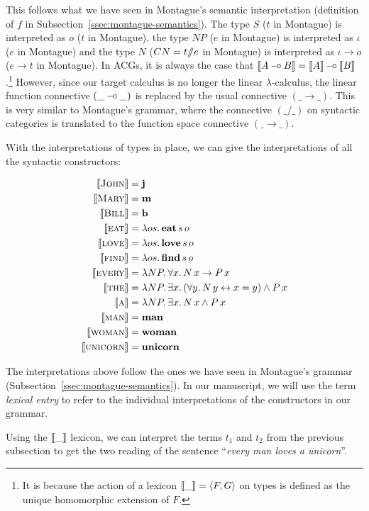 This follows what we have seen in Montague's semantic interpretation
(definition of $f$ in Subsection~\ref{ssec:montague-semantics}). The type
$S$ ($t$ in Montague) is interpreted as $o$ ($t$ in Montague), the type
$NP$ ($e$ in Montague) is interpreted as $\iota$ ($e$ in Montague) and the
type $N$ ($CN = t /\!\!/ e$ in Montague) is interpreted as
$\iota \to o$ ($e \to t$ in Montague). In ACGs, it is always the case that
$\llbracket A \mathbin{{-}\mkern-3.5mu{\circ}} B \rrbracket = \llbracket A \rrbracket \mathbin{{-}\mkern-3.5mu{\circ}} \llbracket B \rrbracket$.\footnote{It is because the
  action of a lexicon $\llbracket \_ \rrbracket = \left< F, G \right>$ on types is defined
  as the unique homomorphic extension of $F$.} However, since our target
calculus is no longer the linear $\lambda$-calculus, the linear function
connective $(\_ \mathbin{{-}\mkern-3.5mu{\circ}} \_)$ is replaced by the usual connective
$(\_ \to \_)$. This is very similar to Montague's grammar, where the
connective $(\_ / \_)$ on syntactic categories is translated to the
function space connective $(\_ \to \_)$.

With the interpretations of types in place, we can give the interpretations
of all the syntactic constructors:

\begin{align*}
  \llbracket \textsc{John} \rrbracket &= \textbf{j} \\
  \llbracket \textsc{Mary} \rrbracket &= \textbf{m} \\
  \llbracket \textsc{Bill} \rrbracket &= \textbf{b} \\
  \llbracket \textsc{eat} \rrbracket &= \lambda o s.\, \textbf{eat}\,s\,o \\
  \llbracket \textsc{love} \rrbracket &= \lambda o s.\, \textbf{love}\,s\,o \\
  \llbracket \textsc{find} \rrbracket &= \lambda o s.\, \textbf{find}\,s\,o \\
  \llbracket \textsc{every} \rrbracket &= \lambda N P.\, \forall x.\, N\,x \to P\,x \\
  \llbracket \textsc{the} \rrbracket &= \lambda N P.\, \exists x.\, (\forall y.\, N\,y \leftrightarrow x = y) \land P\,x \\
  \llbracket \textsc{a} \rrbracket &= \lambda N P.\, \exists x.\, N\,x \land P\,x \\
  \llbracket \textsc{man} \rrbracket &= \textbf{man} \\
  \llbracket \textsc{woman} \rrbracket &= \textbf{woman} \\
  \llbracket \textsc{unicorn} \rrbracket &= \textbf{unicorn}
\end{align*}

The interpretations above follow the ones we have seen in Montague's
grammar (Subsection~\ref{ssec:montague-semantics}). In our manuscript, we
will use the term \emph{lexical entry} to refer to the individual
interpretations of the constructors in our grammar.

Using the $\llbracket \_ \rrbracket$ lexicon, we can interpret the terms $t_1$ and $t_2$
from the previous subsection to get the two reading of the sentence
``\emph{every man loves a unicorn}''.

